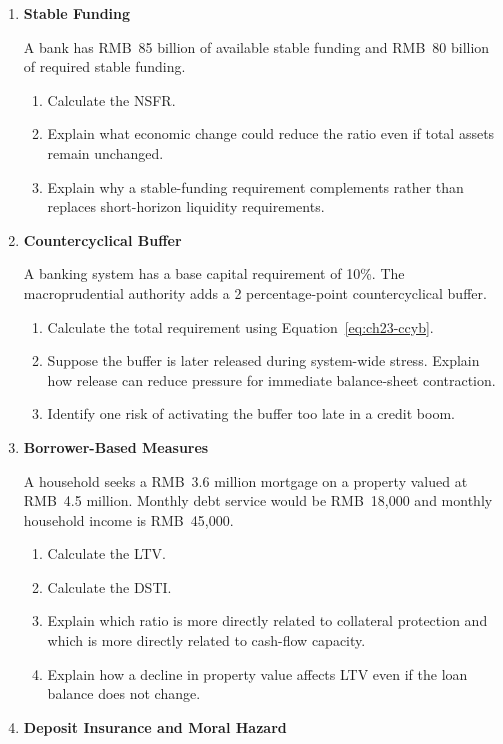 \begin{enumerate}
\item \textbf{Stable Funding}

A bank has RMB~85 billion of available stable funding and RMB~80 billion of required stable funding.

\begin{enumerate}
\item Calculate the NSFR.
\item Explain what economic change could reduce the ratio even if total assets remain unchanged.
\item Explain why a stable-funding requirement complements rather than replaces short-horizon liquidity requirements.
\end{enumerate}


\item \textbf{Countercyclical Buffer}

A banking system has a base capital requirement of 10\%. The macroprudential authority adds a 2 percentage-point countercyclical buffer.

\begin{enumerate}
\item Calculate the total requirement using Equation~\eqref{eq:ch23-ccyb}.
\item Suppose the buffer is later released during system-wide stress. Explain how release can reduce pressure for immediate balance-sheet contraction.
\item Identify one risk of activating the buffer too late in a credit boom.
\end{enumerate}


\item \textbf{Borrower-Based Measures}

A household seeks a RMB~3.6 million mortgage on a property valued at RMB~4.5 million. Monthly debt service would be RMB~18,000 and monthly household income is RMB~45,000.

\begin{enumerate}
\item Calculate the LTV.
\item Calculate the DSTI.
\item Explain which ratio is more directly related to collateral protection and which is more directly related to cash-flow capacity.
\item Explain how a decline in property value affects LTV even if the loan balance does not change.
\end{enumerate}


\item \textbf{Deposit Insurance and Moral Hazard}


\end{enumerate}
